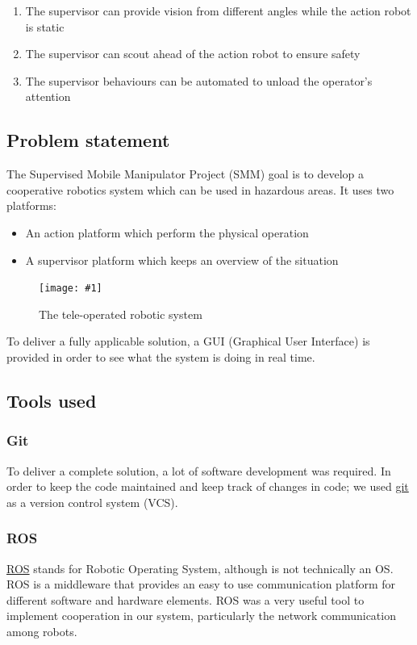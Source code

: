 \documentclass[11pt,a4paper]{article}
\newcommand{\centerFigure}[2]{
\begin{figure}[h]	
\centering
\texttt{[image: \#1]}
\caption{#2}
\end{figure}
}
\begin{document}
\begin{enumerate}
\item The supervisor can provide vision from different angles while the action robot is static
\item The supervisor can scout ahead of the action robot to ensure safety
\item The supervisor behaviours can be automated to unload the operator's attention
\end{enumerate}


\subsection{Problem statement}
The Supervised Mobile Manipulator Project (SMM) goal is to develop a cooperative robotics
system which can be used in hazardous areas. It uses two platforms: 

\begin{itemize}
\item An action platform which perform the physical operation
\item A supervisor platform which keeps an overview of the situation
\end{itemize}

\centerFigure{teleopSystem.png}{The tele-operated robotic system}

To deliver a fully applicable solution, a GUI (Graphical User Interface) is provided in
order to see what the system is doing in real time.


\subsection{Tools used}
\subsubsection{Git}
To deliver a complete solution, a lot of software development was required. In order to keep
the code maintained and keep track of changes in code; we used \href{https://git-scm.com/}{git} as a version control system
 (VCS).

\subsubsection{ROS}
\href{http://www.ros.org}{ROS} stands for Robotic Operating System, although is not technically an OS. ROS is a middleware that provides an easy to use communication platform for different software and hardware elements. ROS was a very useful tool to implement cooperation in our system, particularly the network communication among robots.
\end{document}
